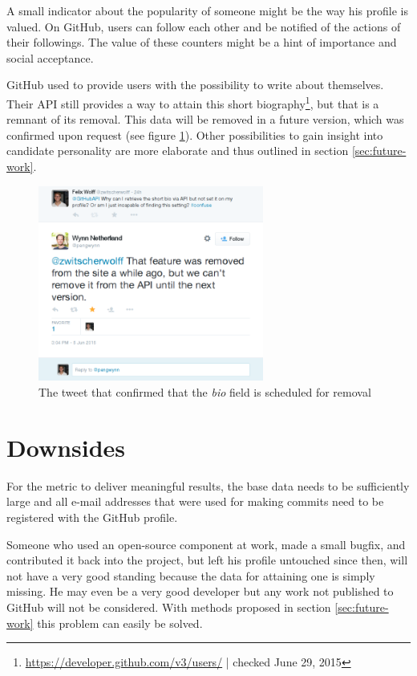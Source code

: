 A small indicator about the popularity of someone might be the way his profile is valued. On GitHub, users can follow each other and be notified of the actions of their followings. The value of these counters might be a hint of importance and social acceptance.

GitHub used to provide users with the possibility to write about themselves. Their API still provides a way to attain this short biography\footnote{\url{https://developer.github.com/v3/users/} | checked June 29, 2015}, but that is a remnant of its removal. This data will be removed in a future version, which was confirmed upon request (see figure \ref{fig:gapitweet}). Other possibilities to gain insight into candidate personality are more elaborate and thus outlined in section \ref{sec:future-work}.

\begin{figure}
  \centering
  \includegraphics[width=20em]{gfx/githubapi_tweet.png}
  \caption{The tweet that confirmed that the \textit{bio} field is scheduled for removal}
  \label{fig:gapitweet}
\end{figure}

\section{Downsides}\label{sec:threatstovalidity}
For the metric to deliver meaningful results, the base data needs to be sufficiently large and all e-mail addresses that were used for making commits need to be registered with the GitHub profile.

Someone who used an open-source component at work, made a small bugfix, and contributed it back into the project, but left his profile untouched since then, will not have a very good standing because the data for attaining one is simply missing. He may even be a very good developer but any work not published to GitHub will not be considered. With methods proposed in section \ref{sec:future-work} this problem can easily be solved.